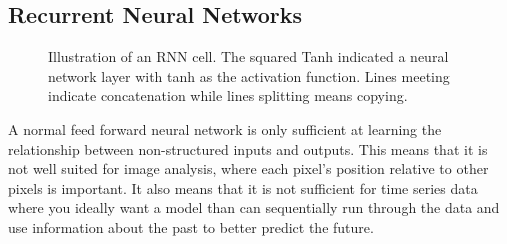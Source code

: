 \subsection{Recurrent Neural Networks}
\begin{figure}
    
    \caption{Illustration of an RNN cell. The squared Tanh indicated a neural 
    network layer with tanh as the activation function. Lines meeting indicate 
    concatenation while lines splitting means copying.}
	\label{RNN figure}
\end{figure}
A normal feed forward neural network is only sufficient at learning the relationship 
between non-structured inputs and outputs. This means that it is not well suited 
for image analysis, where each pixel's position relative to other pixels is important. 
It also means that it is not sufficient for time series data where you ideally 
want a model than can sequentially run through the data and use information about 
the past to better predict the future.

